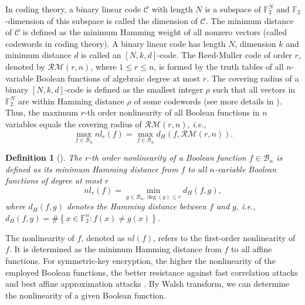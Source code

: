 \documentclass[preprint,10pt]{elsarticle}
\newcommand{\F}{\mathbb{F}}
\newcommand{\0}{\textbf{0}}
\newcommand{\1}{\textbf{1}}
\theoremstyle{plain}
\newtheorem{definition}{Definition}
\begin{document}
    In coding theory, a binary linear code $\mathcal{C}$ with length $N$ is a subspace of $\F_2^N$ and $\F_2$-dimension of this subspace is called the dimension of $\mathcal{C}$.
    The minimum distance of $\mathcal{C}$ is defined as the minimum Hamming weight of all nonzero vectors (called codewords in coding theory).
    A binary linear code has length $N$, dimension $k$ and minimum distance $d$ is called an $\left[ N,k,d \right]$-code.
    The Reed-Muller code of order $r$, denoted by $\mathcal{RM}(r,n)$, where $1\le r\le n$, is formed by the truth tables of all $n$-variable Boolean functions of algebraic degree at most $r$. The covering radius of a binary $\left[ N,k,d \right]$-code is defined as the smallest integer $\rho$ such that all
    vectors in $\F_2^N$ are within Hamming distance $\rho$ of some codewords (see more details in \cite{MS1977}).
    Thus, the maximum $r$-th order nonlinearity of all Boolean functions in $n$ variables equals the covering radius of $\mathcal{RM}(r,n)$, \emph{i.e.},
    \[\max_{f\in \mathcal{B}_n}nl_r(f)=\max_{f\in\mathcal{B}_n}d_H(f,\mathcal{RM}(r,n)).\]
    \begin{definition}[\cite{Carlet2020book}]
        The $r$-th order nonlinearity of a Boolean function $f\in\mathcal{B}_n$ is defined as its minimum Hamming distance from $f$ to all $n$-variable Boolean functions of degree at most $r$
        \[nl_r(f)=\min_{g\in\mathcal{B}_n,\deg(g)\le r} d_H(f,g),\]
        where $d_H(f,g)$ denotes the Hamming distance between $f$ and $g$, i.e., $d_H(f,g)=\#\left\{ x\in\F_2^n : f(x)\ne g(x) \right\}$.
    \end{definition}
    The nonlinearity of $f$, denoted as $nl(f)$, refers to the first-order nonlinearity of $f$. 
    It is determined as the minimum Hamming distance from $f$ to all affine functions.
    For symmetric-key encryption, the higher the nonlinearity of the employed Boolean functions, the better resistance against fast correlation attacks \cite{MS1988fast_correlation_attack} and best affine approximation attacks \cite{DingXS1991book}.
    By Walsh transform, we can determine the nonlinearity of a given Boolean function. 
\end{document}
